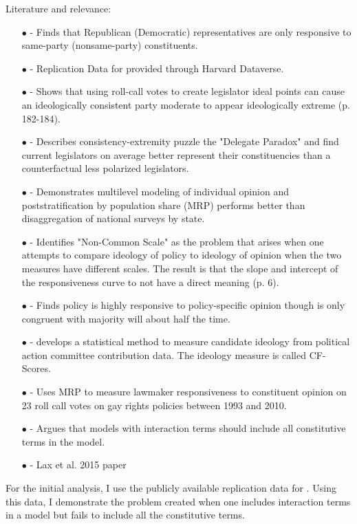 \documentclass[10pt,letterpaper]{article}
\begin{document}
Literature and relevance:
\begin{enumerate}
\item[$\bullet$] \cite{Clinton2006} - Finds that Republican (Democratic) representatives are only responsive to same-party (nonsame-party) constituents.
\item[$\bullet$] \cite{Clinton2009} - Replication Data for \cite{Clinton2006} provided through Harvard Dataverse.
\item[$\bullet$] \cite{Broockman2016} -  Shows that using roll-call votes to create legislator ideal points can cause an ideologically consistent party moderate to appear ideologically extreme (p. 182-184).
\item[$\bullet$] \cite{Ahler2018} - Describes consistency-extremity puzzle the "Delegate Paradox" and find current legislators on average better represent their constituencies than a counterfactual less polarized legislators.
\item[$\bullet$] \cite{Lax2009} - Demonstrates multilevel modeling of individual opinion and poststratification by population share (MRP) performs better than disaggregation of national surveys by state. 
\item[$\bullet$] \cite{Lax2018} - Identifies "Non-Common Scale" as the problem that arises when one attempts to compare ideology of policy to ideology of opinion when the two measures have different scales. The result is that the slope and intercept of the responsiveness curve to not have a direct meaning (p. 6).
\item[$\bullet$] \cite{Lax2012} - Finds policy is highly responsive to policy-specific opinion though is only congruent with majority will about half the time.
\item[$\bullet$] \cite{Bonica2013} - develops a statistical method to measure candidate ideology from political action committee contribution data. The ideology measure is called CF-Scores.
\item[$\bullet$] \cite{Krimmel2016} - Uses MRP to measure lawmaker responsiveness to constituent opinion on 23 roll call votes on gay rights policies between 1993 and 2010.
\item[$\bullet$] \cite{Brambor2006} - Argues that models with interaction terms should include all constitutive terms in the model.
\item[$\bullet$] - Lax et al. 2015 paper
\end{enumerate}

For the initial analysis, I use the publicly available \cite{Clinton2009} replication data for \cite{Clinton2006}. Using this data, I demonstrate the problem created when one includes interaction terms in a model but fails to include all the constitutive terms.
\end{document}
